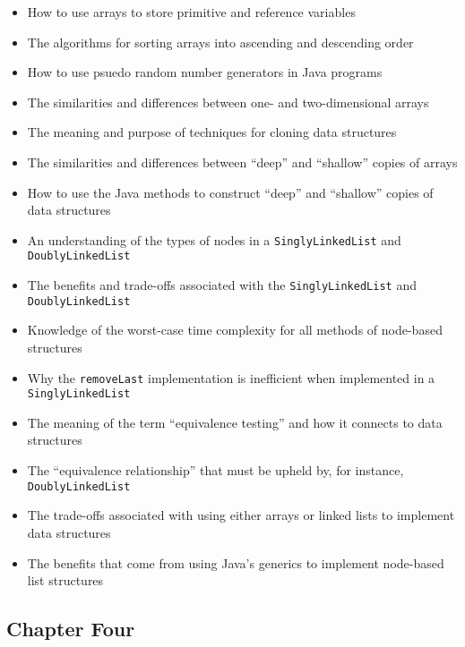 \documentclass[11pt]{article}
\newcommand{\program}[1]{\lstinline{#1}}
\begin{document}
\begin{itemize}

  \setlength{\itemsep}{0.05in}

  \item How to use arrays to store primitive and reference variables
  \item The algorithms for sorting arrays into ascending and descending order
  \item How to use psuedo random number generators in Java programs
  \item The similarities and differences between one- and two-dimensional arrays
  \item The meaning and purpose of techniques for cloning data structures
  \item The similarities and differences between ``deep'' and ``shallow'' copies
    of arrays
  \item How to use the Java methods to construct ``deep'' and ``shallow'' copies
    of data structures
  \item An understanding of the types of nodes in a \program{SinglyLinkedList} and \program{DoublyLinkedList}
  \item The benefits and trade-offs associated with the \program{SinglyLinkedList} and \program{DoublyLinkedList}
  \item Knowledge of the worst-case time complexity for all methods of node-based structures
  \item Why the \program{removeLast} implementation is inefficient when
    implemented in a \program{SinglyLinkedList}
  \item The meaning of the term ``equivalence testing'' and how it connects to data structures
  \item The ``equivalence relationship'' that must be upheld by, for instance, \program{DoublyLinkedList}
  \item The trade-offs associated with using either arrays or linked lists to implement data structures
  \item The benefits that come from using Java's generics to implement node-based list
    structures

\end{itemize}

\vspace*{-.2in}
\subsection*{Chapter Four}
\end{document}
